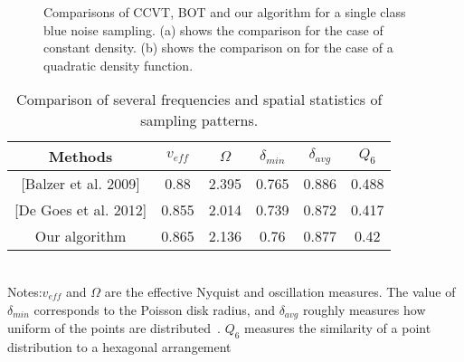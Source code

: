 \begin{figure}[ht]
\centering
{}
\caption{
Comparisons of CCVT, BOT and our algorithm for a single class blue noise sampling.
(a) shows the comparison for the case of constant density.
(b) shows the comparison on for the case of a quadratic density function. }
\label{one-class-sampling}
\end{figure}



\begin{table}
\caption{\label{comparing-table}
Comparison of several frequencies and spatial statistics of sampling patterns.
}
 \begin{tabular}{c|c|c|c|c|c}

  \hline
   Methods & $v_{eff}$ & $\Omega$ & $\delta_{min}$ & $\delta_{avg}$ & $Q_6$ \\ \hline
  {[Balzer et al. 2009]}& 0.88& 2.395 & 0.765 & 0.886 & 0.488 \\
  {[De Goes et al. 2012]} & 0.855 & 2.014 & 0.739 & 0.872 & 0.417 \\
   Our algorithm & 0.865 & 2.136 & 0.76 & 0.877 & 0.42 \\ \hline
  \end{tabular}\\
  Notes:$v_{eff} $ and $\Omega$ are the effective Nyquist and oscillation measures.
The value of $\delta_{min}$ corresponds to the Poisson disk radius,
and $\delta_{avg}$ roughly measures how uniform of the points are distributed~\cite{schlomer:2011:farthest}.
$Q_6$ measures the similarity of a point distribution to a hexagonal arrangement~\cite{kansal:2000:nonequilibrium}
\end{table}


